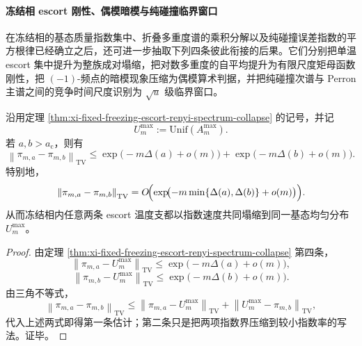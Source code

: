\paragraph{冻结相 escort 刚性、偶模暗模与纯碰撞临界窗口}
在冻结相的基态质量指数集中、折叠多重度谱的乘积分解以及纯碰撞误差指数的平方根律已经确立之后，还可进一步抽取下列四条彼此衔接的后果。它们分别把单温 escort 集中提升为整族成对塌缩，把对数多重度的自平均提升为有限尺度矩母函数刚性，把 \((-1)\)-频点的暗模现象压缩为偶模算术判据，并把纯碰撞次谱与 Perron 主谱之间的竞争时间尺度识别为 \(\sqrt u\) 级临界窗口。

\begin{theorem}\label{thm:xi-time-part9u-frozen-escort-pairwise-tv-collapse}
沿用定理 \ref{thm:xi-fixed-freezing-escort-renyi-spectrum-collapse} 的记号，并记
\[
U_m^{\max}:=\mathrm{Unif}(A_m^{\max}).
\]
若 \(a,b>a_{\mathrm c}\)，则有
\[
\left\|\pi_{m,a}-\pi_{m,b}\right\|_{\mathrm{TV}}
\le
\exp\!\bigl(-m\Delta(a)+o(m)\bigr)
+
\exp\!\bigl(-m\Delta(b)+o(m)\bigr).
\]
特别地，
\[
\left\|\pi_{m,a}-\pi_{m,b}\right\|_{\mathrm{TV}}
=
O\!\Bigl(
\exp\!\bigl(-m\min\{\Delta(a),\Delta(b)\}+o(m)\bigr)
\Bigr).
\]
从而冻结相内任意两条 escort 温度支都以指数速度共同塌缩到同一基态均匀分布 \(U_m^{\max}\)。
\end{theorem}
\begin{proof}
由定理 \ref{thm:xi-fixed-freezing-escort-renyi-spectrum-collapse} 第四条，
\[
\left\|\pi_{m,a}-U_m^{\max}\right\|_{\mathrm{TV}}
\le
\exp\!\bigl(-m\Delta(a)+o(m)\bigr),
\]
\[
\left\|\pi_{m,b}-U_m^{\max}\right\|_{\mathrm{TV}}
\le
\exp\!\bigl(-m\Delta(b)+o(m)\bigr).
\]
由三角不等式，
\[
\left\|\pi_{m,a}-\pi_{m,b}\right\|_{\mathrm{TV}}
\le
\left\|\pi_{m,a}-U_m^{\max}\right\|_{\mathrm{TV}}
+
\left\|U_m^{\max}-\pi_{m,b}\right\|_{\mathrm{TV}},
\]
代入上述两式即得第一条估计；第二条只是把两项指数界压缩到较小指数率的写法。证毕。
\end{proof}

